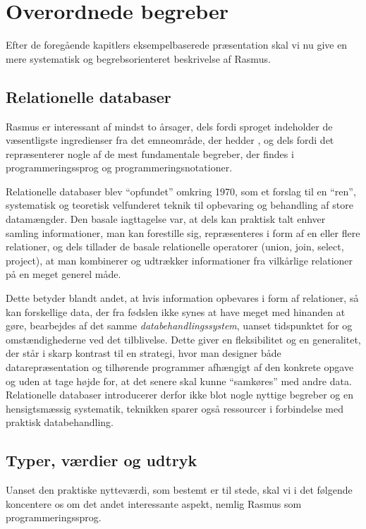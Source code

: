 \newpage
\section{Overordnede begreber}
Efter de foreg\aa{}ende kapitlers eksempelbaserede pr\ae{}sentation
skal vi nu give en mere systematisk og begrebsorienteret beskrivelse af
{\sc Rasmus}.

\subsection{Relationelle databaser}
{\sc Rasmus} er interessant af mindst to \aa{}rsager, dels fordi
sproget indeholder de v\ae{}sentligste ingredienser fra det emneomr\aa{}de,
der hedder {\em {}}, og dels fordi det repr\ae{}senterer
nogle af de mest fundamentale begreber, der findes i programmeringssprog
og programmeringsnotationer.

Relationelle databaser blev ``opfundet'' omkring 1970, som et forslag
til en ``ren'', systematisk og teoretisk velfunderet teknik til
opbevaring og behandling af store datam\ae{}ngder. Den basale
iagttagelse var, at dels kan praktisk talt enhver samling informationer,
man kan forestille sig, repr\ae{}senteres i form af en eller flere
relationer, og dels tillader de basale relationelle operatorer
(union, join, select, project), at man kombinerer og udtr\ae{}kker
informationer fra vilk\aa{}rlige relationer p\aa{} en meget generel
m\aa{}de. 

Dette betyder blandt andet, at hvis information opbevares
i form af relationer, s\aa{} kan forskellige data, der fra f\o{}dslen
ikke synes at have meget med hinanden at g\o{}re, bearbejdes af det samme
{\em databehandlingssystem}, uanset tidspunktet for og omst\ae{}ndighederne
ved det tilblivelse. Dette giver en fleksibilitet og en generalitet,
der st\aa{}r i skarp kontrast til en strategi, hvor man designer b\aa{}de
datarepr\ae{}sentation og tilh\o{}rende programmer afh\ae{}ngigt af
den konkrete opgave og uden at tage h\o{}jde for, at det senere skal kunne
``samk\o{}res'' med andre data. Relationelle databaser introducerer derfor
ikke blot nogle nyttige begreber og en hensigtsm\ae{}ssig systematik,
teknikken sparer ogs\aa{} ressourcer i forbindelse med praktisk 
databehandling.

\subsection{Typer, v\ae{}rdier og udtryk}
Uanset den praktiske nyttev\ae{}rdi, som bestemt er til stede, skal vi
i det f\o{}lgende koncentere os om det andet interessante aspekt, nemlig
{\sc Rasmus} som programmeringssprog. 

